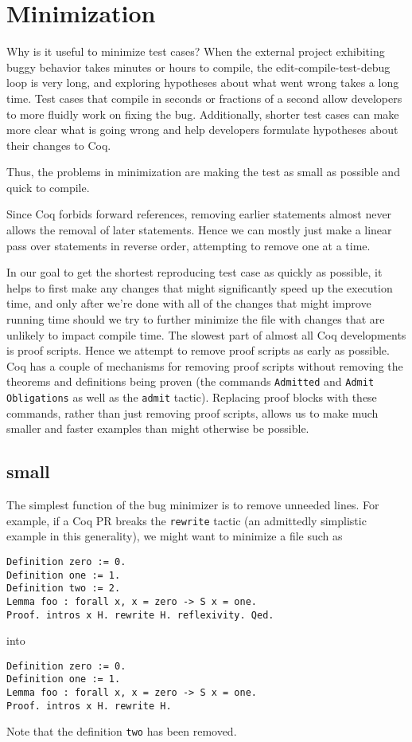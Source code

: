 \documentclass[a4paper,USenglish,cleveref,autoref,thm-restate]{lipics-v2021}
\begin{document}
\section{Minimization}

Why is it useful to minimize test cases?
When the external project exhibiting buggy behavior takes minutes or hours to compile, the edit-compile-test-debug loop is very long, and exploring hypotheses about what went wrong takes a long time.
Test cases that compile in seconds or fractions of a second allow developers to more fluidly work on fixing the bug.
Additionally, shorter test cases can make more clear what is going wrong and help developers formulate hypotheses about their changes to Coq.

Thus, the problems in minimization are making the test as small as possible and quick to compile. 

Since Coq forbids forward references, removing earlier statements almost never allows the removal of later statements.
Hence we can mostly just make a linear pass over statements in reverse order, attempting to remove one at a time.

In our goal to get the shortest reproducing test case as quickly as possible, it helps to first make any changes that might significantly speed up the execution time, and only after we're done with all of the changes that might improve running time should we try to further minimize the file with changes that are unlikely to impact compile time.
  The slowest part of almost all Coq developments is proof scripts.
  Hence we attempt to remove proof scripts as early as possible.
  Coq has a couple of mechanisms for removing proof scripts without removing the theorems and definitions being proven (the commands \verb|Admitted| and \verb|Admit Obligations| as well as the \verb|admit| tactic).
  Replacing proof blocks with these commands, rather than just removing proof scripts, allows us to make much smaller and faster examples than might otherwise be possible.



\subsection{small}

The simplest function of the bug minimizer is to remove unneeded lines.
For example, if a Coq PR breaks the \texttt{rewrite} tactic (an admittedly simplistic example in this generality), we might want to minimize a file such as
\begin{verbatim}
Definition zero := 0.
Definition one := 1.
Definition two := 2.
Lemma foo : forall x, x = zero -> S x = one.
Proof. intros x H. rewrite H. reflexivity. Qed.
\end{verbatim}
into
\begin{verbatim}
Definition zero := 0.
Definition one := 1.
Lemma foo : forall x, x = zero -> S x = one.
Proof. intros x H. rewrite H.
\end{verbatim}
Note that the definition \texttt{two} has been removed.
\end{document}
